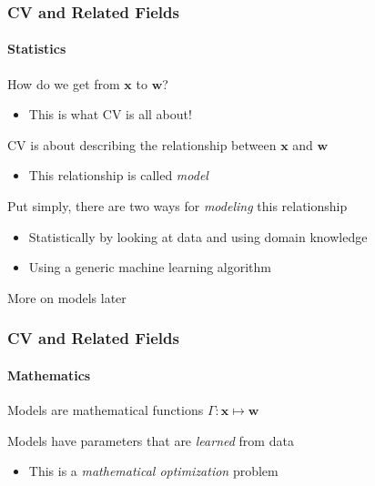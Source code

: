 \documentclass[xetex,professionalfont]{beamer}
\renewcommand{\vec}[1]{\ensuremath{\mathbf{#1}}}
\newcommand{\vw}{\vec{w}}
\newcommand{\vx}{\vec{x}}
\begin{document}
\begin{frame}
\frametitle{CV and Related Fields}
\framesubtitle{Statistics}

How do we get from $\vx$ to $\vw$?
\begin{itemize}
    \item This is what CV is all about!
\end{itemize}

\bigskip
CV is about describing the relationship between $\vx$ and $\vw$
\begin{itemize}
    \item This relationship is called \emph{model}
\end{itemize}

\bigskip
Put simply, there are two ways for \emph{modeling} this relationship
\begin{itemize}
    \item Statistically by looking at data and using domain knowledge
    \item Using a generic machine learning algorithm
\end{itemize}

\bigskip
More on models later

\end{frame}


\begin{frame}
\frametitle{CV and Related Fields}
\framesubtitle{Mathematics}

Models are mathematical functions $\Gamma:\vx\mapsto\vw$ %

\bigskip
Models have parameters that are \emph{learned} from data
\begin{itemize}
    \item This is a \emph{mathematical optimization} problem
\end{itemize}

\end{frame}

\end{document}
